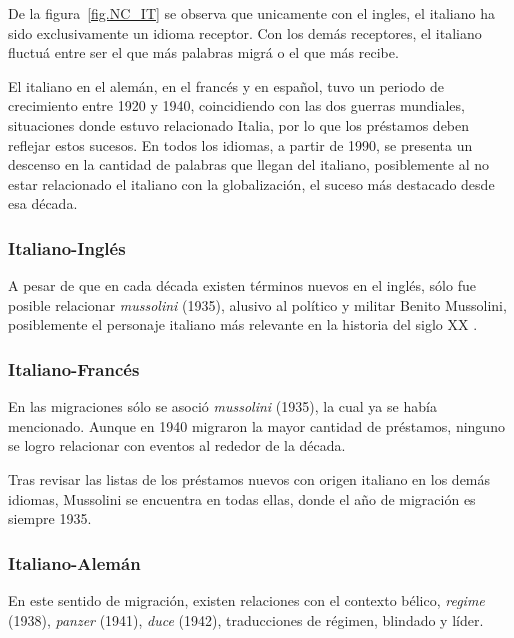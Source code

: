De la figura~\ref{fig.NC_IT} se observa que unicamente con el ingles, el italiano ha sido exclusivamente un idioma receptor. Con los demás receptores,  el italiano fluctuá entre ser el que más palabras migrá o el que más recibe.

El italiano en el alemán, en el francés y en español,  tuvo un periodo de crecimiento entre 1920 y 1940,  coincidiendo con las dos guerras mundiales, situaciones donde estuvo relacionado Italia, por lo que los préstamos deben reflejar estos sucesos.  En todos los idiomas,  a partir de 1990, se presenta un descenso en la cantidad de palabras que llegan del italiano, posiblemente al no estar relacionado el italiano con la globalización, el suceso más destacado desde esa década.   

\subsubsection*{Italiano-Inglés}%

A pesar de que en cada década existen términos nuevos en el inglés, sólo fue posible relacionar \textit{mussolini} (1935),  alusivo al político y militar Benito Mussolini,  posiblemente el personaje italiano más relevante en la historia del siglo XX .

\subsubsection*{Italiano-Francés}%



En las migraciones sólo se asoció \textit{mussolini} (1935), la cual ya se había mencionado. Aunque en 1940 migraron la mayor cantidad de préstamos, ninguno se logro relacionar con eventos al rededor de la década. 

Tras revisar las listas de los préstamos nuevos con origen italiano  en los demás idiomas, Mussolini se encuentra en todas ellas, donde el año de migración es siempre 1935.





\subsubsection*{Italiano-Alemán}%

En este sentido de migración,  existen relaciones con el contexto bélico,  \textit{regime} (1938), \textit{panzer} (1941), \textit{duce} (1942),  traducciones de régimen, blindado y líder.

